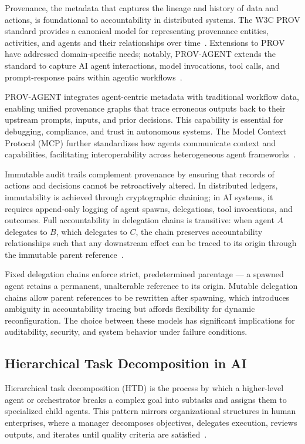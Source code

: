 Provenance, the metadata that captures the lineage and history of data and actions, is foundational to accountability in distributed systems. The W3C PROV standard provides a canonical model for representing provenance entities, activities, and agents and their relationships over time~\cite{w3c_prov_2013}. Extensions to PROV have addressed domain-specific needs; notably, PROV-AGENT extends the standard to capture AI agent interactions, model invocations, tool calls, and prompt-response pairs within agentic workflows~\cite{souza_prov_agent_2025}.

PROV-AGENT integrates agent-centric metadata with traditional workflow data, enabling unified provenance graphs that trace erroneous outputs back to their upstream prompts, inputs, and prior decisions. This capability is essential for debugging, compliance, and trust in autonomous systems. The Model Context Protocol (MCP) further standardizes how agents communicate context and capabilities, facilitating interoperability across heterogeneous agent frameworks~\cite{souza_prov_agent_2025}.

Immutable audit trails complement provenance by ensuring that records of actions and decisions cannot be retroactively altered. In distributed ledgers, immutability is achieved through cryptographic chaining; in AI systems, it requires append-only logging of agent spawns, delegations, tool invocations, and outcomes. Full accountability in delegation chains is transitive: when agent $A$ delegates to $B$, which delegates to $C$, the chain preserves accountability relationships such that any downstream effect can be traced to its origin through the immutable parent reference~\cite{deepmind_delegation_2026}.

Fixed delegation chains enforce strict, predetermined parentage — a spawned agent retains a permanent, unalterable reference to its origin. Mutable delegation chains allow parent references to be rewritten after spawning, which introduces ambiguity in accountability tracing but affords flexibility for dynamic reconfiguration. The choice between these models has significant implications for auditability, security, and system behavior under failure conditions.

\subsection{Hierarchical Task Decomposition in AI}

Hierarchical task decomposition (HTD) is the process by which a higher-level agent or orchestrator breaks a complex goal into subtasks and assigns them to specialized child agents. This pattern mirrors organizational structures in human enterprises, where a manager decomposes objectives, delegates execution, reviews outputs, and iterates until quality criteria are satisfied~\cite{zylos_hierarchical_2026,crewai_hierarchical_2024}.

